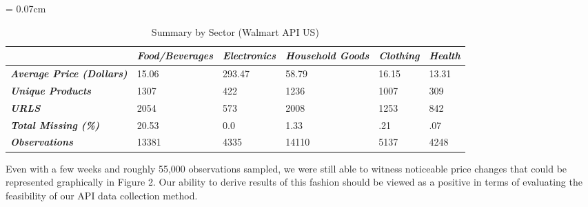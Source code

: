 \begin{center}
\begin{table}[hbt!]
\small
\tabcolsep = 0.07cm
\caption{Summary by Sector (Walmart API US)}
\label{tab:my-table}
\begin{tabular}{|l|lllll|}
\hline
\textbf{} & \textit{\textbf{Food/Beverages}} & \textit{\textbf{Electronics}} & \textit{\textbf{Household Goods}} & \textit{\textbf{Clothing}} & \textit{\textbf{Health}} \\ \hline
\textit{\textbf{Average Price (Dollars)}} & 15.06 & 293.47 & 58.79 & 16.15 & 13.31 \\ \cline{1-1}
\textit{\textbf{Unique Products}} & 1307 & 422 & 1236 & 1007 & 309 \\ \cline{1-1}
\textit{\textbf{URLS}} & 2054 & 573 & 2008 & 1253 & 842 \\ \cline{1-1}
\textit{\textbf{Total Missing (\%)}} & 20.53 & 0.0 & 1.33 & .21 & .07 \\ \cline{1-1}
\textit{\textbf{Observations}} & 13381 & 4335 & 14110 & 5137 & 4248 \\ \hline
\end{tabular}
\end{table}
\end{center}

Even with a few weeks and roughly 55,000 observations sampled, we were still able to witness noticeable price changes that could be represented graphically in Figure 2. Our ability to derive results of this fashion should be viewed as a positive in terms of evaluating the feasibility of our API data collection method.





